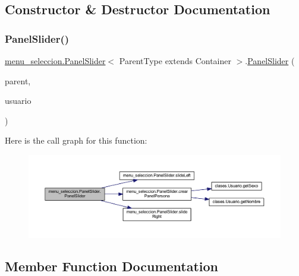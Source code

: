 \subsection{Constructor \& Destructor Documentation}
\mbox{\label{classmenu__seleccion_1_1_panel_slider_ae9eb1a7625a965ddb124dd09cb4fa2fd}} 
\subsubsection{\texorpdfstring{Panel\+Slider()}{PanelSlider()}}
{\footnotesize\ttfamily \mbox{\hyperlink{classmenu__seleccion_1_1_panel_slider}{menu\+\_\+seleccion.\+Panel\+Slider}}$<$ Parent\+Type extends Container $>$.\mbox{\hyperlink{classmenu__seleccion_1_1_panel_slider}{Panel\+Slider}} (\begin{DoxyParamCaption}\item[{final Parent\+Type}]{parent,  }\item[{\mbox{\hyperlink{classclases_1_1_usuario}{Usuario}}}]{usuario }\end{DoxyParamCaption})}

Here is the call graph for this function\+:
\nopagebreak
\begin{figure}[H]
\begin{center}
\leavevmode
\includegraphics[width=350pt]{classmenu__seleccion_1_1_panel_slider_ae9eb1a7625a965ddb124dd09cb4fa2fd_cgraph}
\end{center}
\end{figure}


\subsection{Member Function Documentation}
\mbox{\label{classmenu__seleccion_1_1_panel_slider_a785cef2aa278e747968467512334debe}} 
